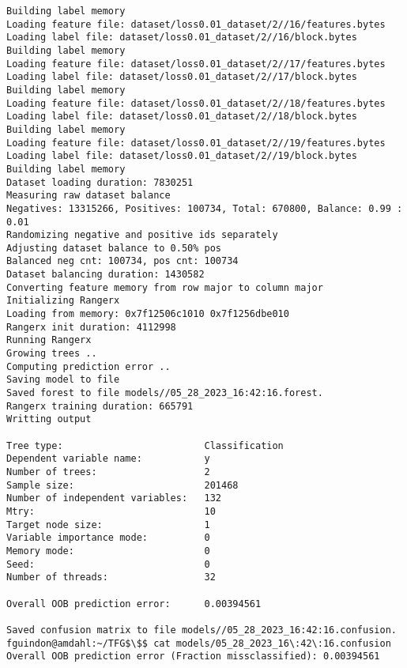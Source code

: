 \documentclass[12pt,oneside]{book}
\begin{document}
\begin{lstlisting}
Building label memory
Loading feature file: dataset/loss0.01_dataset/2//16/features.bytes
Loading label file: dataset/loss0.01_dataset/2//16/block.bytes
Building label memory
Loading feature file: dataset/loss0.01_dataset/2//17/features.bytes
Loading label file: dataset/loss0.01_dataset/2//17/block.bytes
Building label memory
Loading feature file: dataset/loss0.01_dataset/2//18/features.bytes
Loading label file: dataset/loss0.01_dataset/2//18/block.bytes
Building label memory
Loading feature file: dataset/loss0.01_dataset/2//19/features.bytes
Loading label file: dataset/loss0.01_dataset/2//19/block.bytes
Building label memory
Dataset loading duration: 7830251
Measuring raw dataset balance
Negatives: 13315266, Positives: 100734, Total: 670800, Balance: 0.99 : 0.01
Randomizing negative and positive ids separately
Adjusting dataset balance to 0.50% pos
Balanced neg cnt: 100734, pos cnt: 100734
Dataset balancing duration: 1430582
Converting feature memory from row major to column major
Initializing Rangerx
Loading from memory: 0x7f12506c1010 0x7f1256dbe010
Rangerx init duration: 4112998
Running Rangerx
Growing trees ..
Computing prediction error ..
Saving model to file
Saved forest to file models//05_28_2023_16:42:16.forest.
Rangerx training duration: 665791
Writting output

Tree type:                         Classification
Dependent variable name:           y
Number of trees:                   2
Sample size:                       201468
Number of independent variables:   132
Mtry:                              10
Target node size:                  1
Variable importance mode:          0
Memory mode:                       0
Seed:                              0
Number of threads:                 32

Overall OOB prediction error:      0.00394561

Saved confusion matrix to file models//05_28_2023_16:42:16.confusion.
fguindon@amdahl:~/TFG$\$$ cat models/05_28_2023_16\:42\:16.confusion 
Overall OOB prediction error (Fraction missclassified): 0.00394561


\end{lstlisting}
\end{document}
